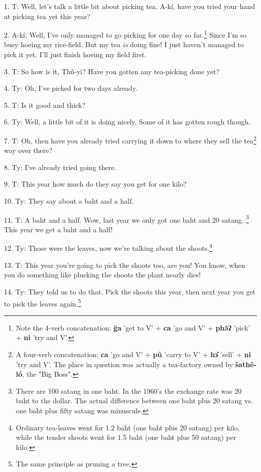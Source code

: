 \setcounter{footnote}{0}


1. T: Well, let's talk a little bit about picking tea. A-kí, have you tried
your hand at picking tea yet this year?

2. A-kí: Well, I've only managed to go picking for one day so far.\footnote{Note the 4-verb concatenation: \textbf{g̈a} 'get to V' + \textbf{ca} 'go and V' + \textbf{phə̂ʔ} 'pick' + \textbf{ni} 'try and V'.} Since I'm
so busy hoeing my rice-field. But my tea \textit{is} doing fine! I just haven't
managed to pick it yet. I'll just finish hoeing my field first.

3. T: So how is it, Thû-yì? Have you gotten any tea-picking done yet?

4. Ty: Oh, I've picked for two days already.

5. T: Is it good and thick?

6. Ty: Well, a little bit of it is doing nicely. Some of it has gotten rough though.

7. T: Oh, then have you already tried carrying it down to where they sell the
tea\footnote{A four-verb concatenation: \textbf{ca} 'go and V' + \textbf{pû} 'carry to V' + \textbf{hɔ̂} 'sell' + \textbf{ni} 'try and V'. The place in question was actually a tea-factory owned by \textbf{šathê-ló}, the "Big Boss".} way over there?

8. Ty: I've already tried going there.

9. T: This year how much do they say you get for one kilo?

10. Ty: They say about a baht and a half.

11. T: A baht and a half. Wow, last year we only got one baht and 20 satang.
\footnote{There are 100 satang in one baht. In the 1960's the exchange rate was 20 baht to the dollar. The actual difference between one baht plus 20 satang vs. one baht plus fifty satang was minuscule.} This year we get a baht and a half!

12. Ty: Those were the leaves, now we're talking about the shoots.\footnote{Ordinary tea-leaves went for 1.2 baht (one baht plus 20 satang) per kilo, while the tender shoots went for 1.5 baht (one baht plus 50 satang) per kilo.}

13. T: This year you're going to pick the shoots too, are you! You know, when
you do something like plucking the shoots the plant nearly dies!

14. Ty: They told us to do that. Pick the shoots this year, then next year you
get to pick the leaves again.\footnote{The same principle as pruning a tree.}

